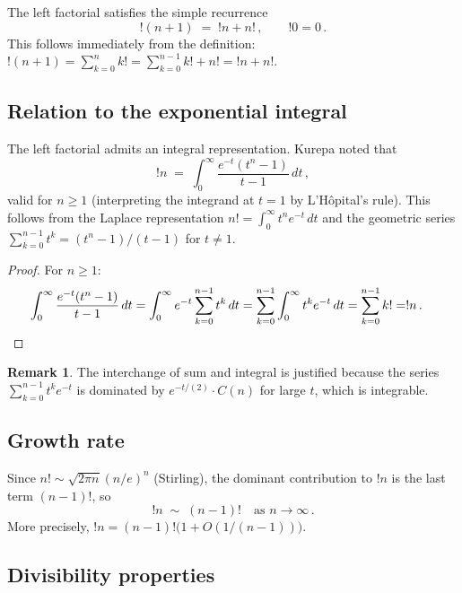 \documentclass[12pt,a4paper]{amsart}
\theoremstyle{definition}
\newtheorem{remark}[theorem]{Remark}
\begin{document}
The left factorial satisfies the simple recurrence
\begin{equation}\label{eq:recurrence}
  !(n+1) \;=\; !n + n!\,, \qquad !0 = 0\,.
\end{equation}
This follows immediately from the definition:
$!(n+1) = \sum_{k=0}^{n} k! = \sum_{k=0}^{n-1} k! + n! = !n + n!$.

\subsection{Relation to the exponential integral}

The left factorial admits an integral representation.
Kurepa noted that
\begin{equation}\label{eq:integral}
  !n \;=\; \int_0^{\infty} \frac{e^{-t}(t^n - 1)}{t - 1}\,dt\,,
\end{equation}
valid for $n \geq 1$ (interpreting the integrand at $t = 1$ by
L'H\^{o}pital's rule).
This follows from the Laplace representation
$n! = \int_0^\infty t^n e^{-t}\,dt$ and the geometric series
$\sum_{k=0}^{n-1} t^k = (t^n - 1)/(t-1)$ for $t \neq 1$.

\begin{proof}
For $n \geq 1$:
\begin{align*}
\int_0^{\infty} \frac{e^{-t}(t^n - 1)}{t - 1}\,dt
&= \int_0^{\infty} e^{-t} \sum_{k=0}^{n-1} t^k \,dt
= \sum_{k=0}^{n-1} \int_0^{\infty} t^k e^{-t}\,dt
= \sum_{k=0}^{n-1} k! = !n\,. \qedhere
\end{align*}
\end{proof}

\begin{remark}
The interchange of sum and integral is justified because the series
$\sum_{k=0}^{n-1} t^k e^{-t}$ is dominated by $e^{-t/(2)} \cdot C(n)$ for
large $t$, which is integrable.
\end{remark}

\subsection{Growth rate}

Since $n! \sim \sqrt{2\pi n}(n/e)^n$ (Stirling), the dominant contribution
to $!n$ is the last term $(n-1)!$, so
\[
  !n \;\sim\; (n-1)! \quad \text{as } n \to \infty\,.
\]
More precisely, $!n = (n-1)!\bigl(1 + O(1/(n-1))\bigr)$.

\subsection{Divisibility properties}
\end{document}
